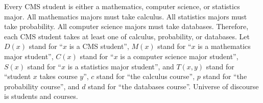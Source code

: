 \documentclass[]{article}
\begin{document}
\begin{question}{3.2}
    Every CMS student is either a mathematics, computer science, or statistics major. All mathematics majors must
take calculus. All statistics majors must take probability. All computer science majors must take databases.
Therefore, each CMS student takes at least one of calculus, probability, or databases.
\medbreak
Let $D(x)$ stand for “$x$ is a CMS student”, $M(x)$ stand for “$x$ is a mathematics major student”, $C(x)$ stand for
“$x$ is a computer science major student”, $S(x)$ stand for “$x$ is a statistics major student”, and $T(x, y)$ stand for
“student $x$ takes course $y$”, $c$ stand for “the calculus course”, $p$ stand for “the probability course”, and $d$ stand
for “the databases course”. Universe of discourse is students and courses.
\end{question}
    
\end{document}
